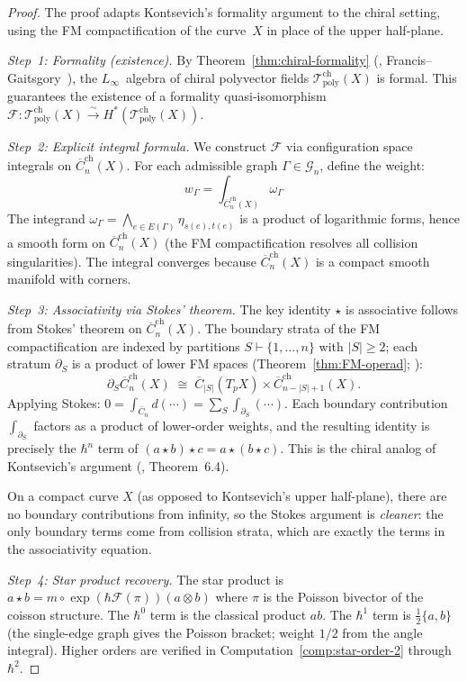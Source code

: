 \begin{proof}
The proof adapts Kontsevich's formality argument to the chiral setting,
using the FM compactification of the curve~$X$ in place of the
upper half-plane.

\emph{Step~1: Formality (existence).}
By Theorem~\ref{thm:chiral-formality}
(\ClaimStatusProvedElsewhere, Francis--Gaitsgory~\cite{FG12}), the $L_\infty$~algebra
of chiral polyvector fields $\mathcal{T}_{\text{poly}}^{\text{ch}}(X)$ is
formal.  This guarantees the existence of a formality quasi-isomorphism
$\mathcal{F}\colon \mathcal{T}_{\text{poly}}^{\text{ch}}(X) \xrightarrow{\sim}
H^*(\mathcal{T}_{\text{poly}}^{\text{ch}}(X))$.

\emph{Step~2: Explicit integral formula.}
We construct $\mathcal{F}$ via configuration space integrals on
$\overline{C}_n^{\text{ch}}(X)$.  For each admissible graph
$\Gamma \in \mathcal{G}_n$, define the weight:
\[
w_\Gamma = \int_{\overline{C}_n^{\text{ch}}(X)} \omega_\Gamma
\]
The integrand $\omega_\Gamma = \bigwedge_{e \in E(\Gamma)} \eta_{s(e),t(e)}$
is a product of logarithmic forms, hence a smooth form on
$\overline{C}_n^{\text{ch}}(X)$ (the FM compactification resolves all
collision singularities).  The integral converges because
$\overline{C}_n^{\text{ch}}(X)$ is a compact smooth manifold with corners.

\emph{Step~3: Associativity via Stokes' theorem.}
The key identity $\star$ is associative follows from Stokes' theorem on
$\overline{C}_n^{\text{ch}}(X)$.  The boundary strata of the FM
compactification are indexed by partitions $S \vdash \{1, \ldots, n\}$
with $|S| \geq 2$; each stratum $\partial_S$ is a product of lower
FM spaces (Theorem~\ref{thm:FM-operad}; \cite{FM94}):
\[
\partial_S \overline{C}_n^{\text{ch}}(X) \;\cong\;
\overline{C}_{|S|}(T_p X) \times \overline{C}_{n-|S|+1}^{\text{ch}}(X).
\]
Applying Stokes: $0 = \int_{\overline{C}_n} d(\cdots)
= \sum_S \int_{\partial_S} (\cdots)$.  Each boundary contribution
$\int_{\partial_S}$ factors as a product of lower-order weights, and the
resulting identity is precisely the $\hbar^n$ term of
$(a \star b) \star c = a \star (b \star c)$.  This is the chiral analog
of Kontsevich's argument (\cite{Kon03}, Theorem~6.4).

On a compact curve $X$ (as opposed to Kontsevich's upper half-plane),
there are no boundary contributions from infinity, so the Stokes argument
is \emph{cleaner}: the only boundary terms come from collision strata,
which are exactly the terms in the associativity equation.

\emph{Step~4: Star product recovery.}
The star product is $a \star b = m \circ \exp(\hbar \mathcal{F}(\pi))(a \otimes b)$
where $\pi$ is the Poisson bivector of the coisson structure.  The $\hbar^0$ term is the
classical product $ab$.  The $\hbar^1$ term is $\frac{1}{2}\{a,b\}$
(the single-edge graph gives the Poisson bracket; weight $1/2$ from the
angle integral).  Higher orders are verified in
Computation~\ref{comp:star-order-2} through $\hbar^2$.
\end{proof}

